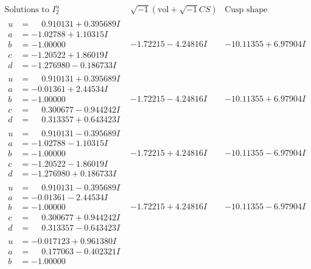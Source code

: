\documentclass[1p]{elsarticle_modified}
\theoremstyle{definition}
\newcommand{\I}{\sqrt{-1}}
\begin{document}
$$\begin{array}{c|c|c}  
\text{Solutions to }I^u_{2}& \I (\text{vol} + \sqrt{-1}CS) & \text{Cusp shape}\\
 \hline 
\begin{aligned}
u &= \phantom{-}0.910131 + 0.395689 I \\
a &= -1.02788 + 1.10315 I \\
b &= -1.00000\phantom{ +0.000000I} \\
c &= -1.20522 + 1.86019 I \\
d &= -1.276980 - 0.186733 I\end{aligned}
 & -1.72215 - 4.24816 I & -10.11355 + 6.97904 I \\ \hline\begin{aligned}
u &= \phantom{-}0.910131 + 0.395689 I \\
a &= -0.01361 + 2.44534 I \\
b &= -1.00000\phantom{ +0.000000I} \\
c &= \phantom{-}0.300677 - 0.944242 I \\
d &= \phantom{-}0.313357 + 0.643423 I\end{aligned}
 & -1.72215 - 4.24816 I & -10.11355 + 6.97904 I \\ \hline\begin{aligned}
u &= \phantom{-}0.910131 - 0.395689 I \\
a &= -1.02788 - 1.10315 I \\
b &= -1.00000\phantom{ +0.000000I} \\
c &= -1.20522 - 1.86019 I \\
d &= -1.276980 + 0.186733 I\end{aligned}
 & -1.72215 + 4.24816 I & -10.11355 - 6.97904 I \\ \hline\begin{aligned}
u &= \phantom{-}0.910131 - 0.395689 I \\
a &= -0.01361 - 2.44534 I \\
b &= -1.00000\phantom{ +0.000000I} \\
c &= \phantom{-}0.300677 + 0.944242 I \\
d &= \phantom{-}0.313357 - 0.643423 I\end{aligned}
 & -1.72215 + 4.24816 I & -10.11355 - 6.97904 I \\ \hline\begin{aligned}
u &= -0.017123 + 0.961380 I \\
a &= \phantom{-}0.177063 - 0.402321 I \\
b &= -1.00000\phantom{ +0.000000I} \\

\end{aligned}
\end{array}$$
\end{document}
